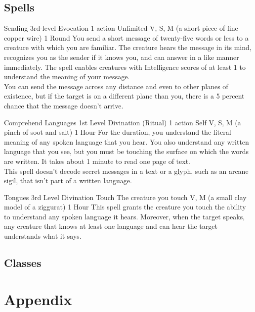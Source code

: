\documentclass[10pt,twoside,twocolumn,openany,nomultitoc]{book}
\begin{document}
\section{Spells}\vspace{6pt}

    \DndSpellHeader%
      {Sending}
      {3rd-level Evocation}
      {1 action}
      {Unlimited}
      {V, S, M (a short piece of fine copper wire)}
      {1 Round}
            You send a short message of twenty-five words or less to a creature with which you are familiar. The creature hears the message in its mind, recognizes you as the sender if it knows you, and can answer in a like manner immediately. The spell enables creatures with Intelligence scores of at least 1 to understand the meaning of your message. \\
            You can send the message across any distance and even to other planes of existence, but if the target is on a different plane than you, there is a 5 percent chance that the message doesn't arrive.
        
    \DndSpellHeader%
      {Comprehend Languages}
      {1st Level Divination (Ritual)}
      {1 action}
      {Self}
      {V, S, M (a pinch of soot and salt)}
      {1 Hour}
    For the duration, you understand the literal meaning of any spoken language that you hear. You also understand any written language that you see, but you must be touching the surface on which the words are written. It takes about 1 minute to read one page of text. \\
    This spell doesn’t decode secret messages in a text or a glyph, such as an arcane sigil, that isn’t part of a written language.        
    
    \DndSpellHeader%
      {Tongues}
      {3rd Level Divination}
      {Touch}
      {The creature you touch}
      {V, M (a small clay model of a ziggurat)}
      {1 Hour}
    This spell grants the creature you touch the ability to understand any spoken language it hears. Moreover, when the target speaks, any creature that knows at least one language and can hear the target understands what it says.

            
\section{Classes}

\chapter{Appendix}
\end{document}
